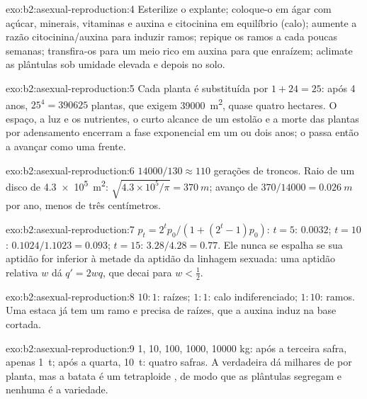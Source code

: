 \begin{solution}{exo:b2:asexual-reproduction:4}
Esterilize o explante; coloque-o em ágar com açúcar, minerais,
vitaminas e auxina e citocinina em equilíbrio (calo); aumente a razão
citocinina/auxina para induzir ramos; repique os ramos a cada poucas
semanas; transfira-os para um meio rico em auxina para que enraízem;
aclimate as plântulas sob umidade elevada e depois no solo.
\end{solution}

\begin{solution}{exo:b2:asexual-reproduction:5}
Cada planta é substituída por $1 + 24 = 25$: após 4 anos, $25^{4} =
\num{390625}$ plantas, que exigem \qty{39000}{m^2}, quase quatro
hectares. O espaço, a luz e os nutrientes, o curto alcance de um
estolão e a morte das plantas por adensamento encerram a fase
exponencial em um ou dois anos; o  passa então a avançar como uma
frente.
\end{solution}

\begin{solution}{exo:b2:asexual-reproduction:6}
$\num{14000}/130 \approx 110$ gerações de troncos. Raio de um disco
de \qty{4.3e5}{m^2}: $\sqrt{4.3\times 10^{5}/\pi} = \qty{370}{m}$;
avanço de $370/\num{14000} = \qty{0.026}{m}$ por ano, menos de três
centímetros.
\end{solution}

\begin{solution}{exo:b2:asexual-reproduction:7}
$p_t = 2^{t}p_0/(1 + (2^{t} - 1)p_0)$: $t = 5$: $0.0032$; $t = 10$:
$0.1024/1.1023 = 0.093$; $t = 15$: $3.28/4.28 = 0.77$. Ele nunca se
espalha se sua aptidão for inferior à metade da aptidão da linhagem
sexuada: uma aptidão relativa $w$ dá $q' = 2wq$, que decai para $w <
\tfrac12$.
\end{solution}

\begin{solution}{exo:b2:asexual-reproduction:8}
$10 : 1$: raízes; $1 : 1$: calo indiferenciado; $1 : 10$: ramos. Uma
estaca já tem um ramo e precisa de raízes, que a auxina induz na base
cortada.
\end{solution}

\begin{solution}{exo:b2:asexual-reproduction:9}
1, 10, 100, \num{1000}, \num{10000} kg: após a terceira safra, apenas
\qty{1}{t}; após a quarta, \qty{10}{t}: quatro safras. A 
verdadeira dá milhares de  por planta, mas a batata é um
tetraploide , de modo que as plântulas segregam e nenhuma é
a variedade.
\end{solution}

